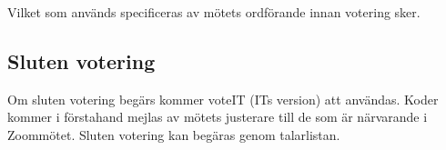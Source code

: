 \documentclass[11pt, noincludeaddress, nopagination]{classes/cthit}
\begin{document}
Vilket som används specificeras av mötets ordförande innan votering sker.  

\subsection*{Sluten votering}
Om sluten votering begärs kommer voteIT (ITs version) att användas. Koder kommer i förstahand mejlas av mötets justerare till de som är närvarande i Zoommötet. Sluten votering kan begäras genom talarlistan.
\end{document}

